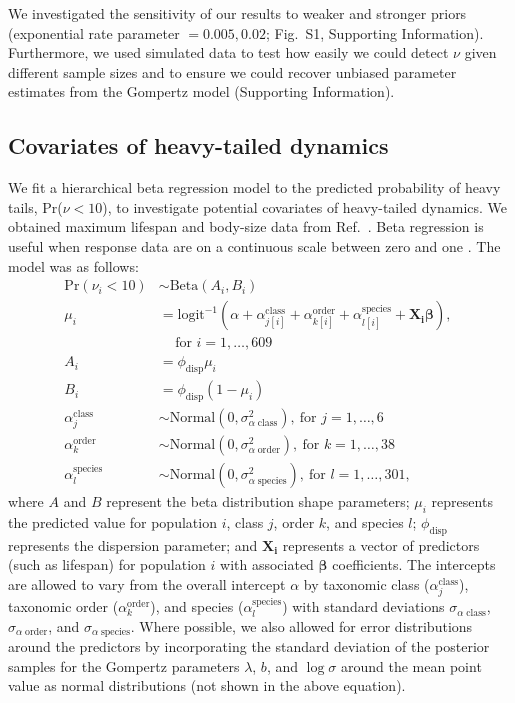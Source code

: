 \documentclass[9pt,twocolumn,twoside]{pnas-new}
\newcommand{\figpriors}{{1}}
\begin{document}
{We investigated the sensitivity
of our results to weaker and stronger priors (exponential rate parameter $=
0.005, 0.02$; Fig.~S\figpriors, Supporting Information). Furthermore, we used
simulated data to test how easily we could detect $\nu$ given different sample
sizes and to ensure we could recover unbiased parameter estimates from the
Gompertz model (Supporting Information).

\subsection{Covariates of heavy-tailed dynamics} We fit a hierarchical beta
regression model to the predicted probability of heavy tails, Pr(\(\nu < 10\)),
to investigate potential covariates of heavy-tailed dynamics. We obtained
maximum lifespan and body-size data from Ref.~\cite{brook2006a}.
Beta regression is useful when response data are on a continuous scale
between zero and one \cite{ferrari2004}. The model was as follows:
\begin{align*}
\mathrm{Pr}(\nu_i < 10) &\sim \mathrm{Beta}(A_i, B_i)\\
\mu_i &= \mathrm{logit}^{-1}(\alpha
  + \alpha^\mathrm{class}_{j[i]}
  + \alpha^\mathrm{order}_{k[i]}
  + \alpha^\mathrm{species}_{l[i]}
  + \bm{X_i} \bm{\beta}),
  \: \\
  &\quad \, \text{for } i = 1, \dots, 609\\
A_i &= \phi_\mathrm{disp} \mu_i\\
B_i &= \phi_\mathrm{disp} (1 - \mu_i)\\
\alpha^\mathrm{class}_j &\sim
  \mathrm{Normal}(0, \sigma^2_{\alpha \; \mathrm{class}}),
  \: \text{for } j = 1, \dots, 6\\
\alpha^\mathrm{order}_k &\sim
  \mathrm{Normal}(0, \sigma^2_{\alpha \; \mathrm{order}}),
  \: \text{for } k = 1, \dots, 38\\
\alpha^\mathrm{species}_l &\sim
  \mathrm{Normal}(0, \sigma^2_{\alpha \; \mathrm{species}}),
  \: \text{for } l = 1, \dots, 301,
\end{align*}
where \(A\) and \(B\) represent the beta distribution shape parameters;
\(\mu_i\) represents the predicted value for population \(i\), class \(j\),
order \(k\), and species \(l\); \(\phi_\mathrm{disp}\) represents the
dispersion parameter; and \(\bm{X_i}\) represents a vector of predictors (such as
lifespan) for population \(i\) with associated \(\bm{\beta}\) coefficients. The
intercepts are allowed to vary from the overall intercept \(\alpha\) by
taxonomic class (\(\alpha^\mathrm{class}_j\)), taxonomic order
(\(\alpha^\mathrm{order}_k\)), and species (\(\alpha^\mathrm{species}_l\)) with
standard deviations \(\sigma_{\alpha \; \mathrm{class}}\), \(\sigma_{\alpha \;
\mathrm{order}}\), and \(\sigma_{\alpha \; \mathrm{species}}\). Where possible,
we also allowed for error distributions around the predictors by incorporating
the standard deviation of the posterior samples for the Gompertz parameters
\(\lambda\), \(b\), and \(\log \sigma\) around the mean point value as normal
distributions (not shown in the above equation).

}
\end{document}
